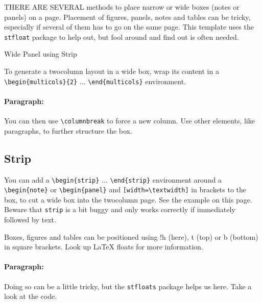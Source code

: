 \documentclass[english]{vaesen-supplement}
\begin{document}
\noindent THERE ARE SEVERAL methods to place narrow or wide boxes (notes or panels) on a page.
Placement of figures, panels, notes and tables can be tricky, especially if several of them has to go on the same page. This template uses the \verb|stfloat| package to help out, but fool around and find out is often needed. 

\begin{strip}
    \begin{panel}[wide]{Wide Panel using Strip}
        \begin{multicols}{2}%
            To generate a twocolumn layout in a wide box, wrap its content in a \verb|\begin{multicols}{2}| ... \verb|\end{multicols}| environment.
        \columnbreak
            \paragraph{Paragraph:}
            You can then use \verb|\columnbreak| to force a new column. Use other elements, like paragraphs, to further structure the box.
        \end{multicols}
    \end{panel}
\end{strip}

\subsection{Strip}
You can add a  \verb|\begin{strip}| ... \verb|\end{strip}| environment around a \verb|\begin{note}| or \verb|\begin{panel}| and \verb|[width=\textwidth]| in brackets to the box, to cut a wide box into the twocolumn page. See the example on this page. Beware that \verb|strip| is a bit buggy and only works correctly if immediately followed by text.

\begin{note}[wide,float*=!b]
    \begin{multicols}{2}
        Boxes, figures and tables can be positioned using !h (here), t (top) or b (bottom) in square brackets. Look up LaTeX floats for more information.
    \columnbreak
        \paragraph{Paragraph:}
        Doing so can be a little tricky, but the \verb|stfloats| package helps us here. Take a look at the code. 
    \end{multicols}
\end{note}
\end{document}

